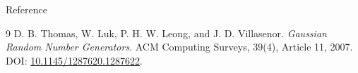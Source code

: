 \documentclass[aspectratio=169]{beamer}
\begin{document}
\begin{frame}{Reference}
\small
\begin{thebibliography}{9}
D. B. Thomas, W. Luk, P. H. W. Leong, and J. D. Villasenor.
\newblock \emph{Gaussian Random Number Generators}.
\newblock ACM Computing Surveys, 39(4), Article 11, 2007.\\
\newblock DOI: \href{https://doi.org/10.1145/1287620.1287622}{10.1145/1287620.1287622}.
\end{thebibliography}
\end{frame}
 
\end{document}
